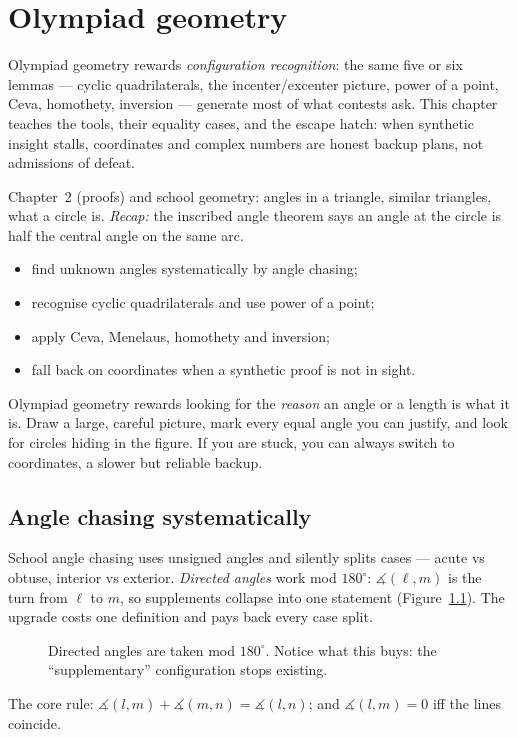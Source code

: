\chapter{Olympiad geometry}

Olympiad geometry rewards \emph{configuration recognition}: the same
five or six lemmas --- cyclic quadrilaterals, the incenter/excenter
picture, power of a point, Ceva, homothety, inversion --- generate most
of what contests ask. This chapter teaches the tools, their equality
cases, and the escape hatch: when synthetic insight stalls, coordinates
and complex numbers are honest backup plans, not admissions of defeat.

\begin{rulebox}
Chapter~2 (proofs) and school geometry: angles in a triangle, similar triangles, what a circle is. \emph{Recap:} the inscribed angle theorem says an angle at the circle is half the central angle on the same arc.
\end{rulebox}
\begin{wins}
\begin{itemize}
\item find unknown angles systematically by angle chasing;
\item recognise cyclic quadrilaterals and use power of a point;
\item apply Ceva, Menelaus, homothety and inversion;
\item fall back on coordinates when a synthetic proof is not in sight.
\end{itemize}
\end{wins}
\begin{principle}
Olympiad geometry rewards looking for the \emph{reason} an angle or a length is what it is. Draw a large, careful picture, mark every equal angle you can justify, and look for circles hiding in the figure. If you are stuck, you can always switch to coordinates, a slower but reliable backup.
\end{principle}

\section{Angle chasing systematically}
School angle chasing uses unsigned angles and silently splits cases ---
acute vs obtuse, interior vs exterior. \emph{Directed
angles} work mod $180^\circ$:
$\measuredangle(\ell,m)$ is the turn from $\ell$ to $m$, so supplements
collapse into one statement (Figure~\ref{fig:directed}). The upgrade
costs one definition and pays back every case split.
\begin{figure}[ht]\centering

\caption{Directed angles are taken mod $180^\circ$. Notice what this
buys: the ``supplementary'' configuration stops existing.}
\label{fig:directed}
\end{figure}
The core rule: $\measuredangle(l,m) + \measuredangle(m,n) =
\measuredangle(l,n)$; and $\measuredangle(l,m)=0$ iff the lines
coincide.

